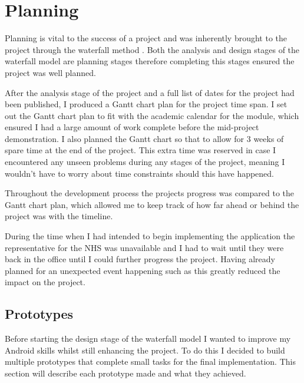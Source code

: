 \section{Planning}
Planning is vital to the success of a project and was inherently brought to the project through the waterfall method \cite{waterfall}. Both the analysis and design stages of the waterfall model are planning stages therefore completing this stages ensured the project was well planned.

After the analysis stage of the project and a full list of dates for the project had been published, I produced a Gantt chart plan for the project time span. I set out the Gantt chart plan to fit with the academic calendar for the module, which ensured I had a large amount of work complete before the mid-project demonstration. I also planned the Gantt chart so that to allow for 3 weeks of spare time at the end of the project. This extra time was reserved in case I encountered any unseen problems during any stages of the project, meaning I wouldn't have to worry about time constraints should this have happened. 

Throughout the development process the projects progress was compared to the Gantt chart plan, which allowed me to keep track of how far ahead or behind the project was with the timeline.

During the time when I had intended to begin implementing the application the representative for the NHS was unavailable and I had to wait until they were back in the office until I could further progress the project. Having already planned for an unexpected event happening such as this greatly reduced the impact on the project. 

\subsection{Prototypes}

Before starting the design stage of the waterfall model \cite{waterfall} I wanted to improve my Android skills whilst still enhancing the project. To do this I decided to build multiple prototypes that complete small tasks for the final implementation. This section will describe each prototype made and what they achieved.

